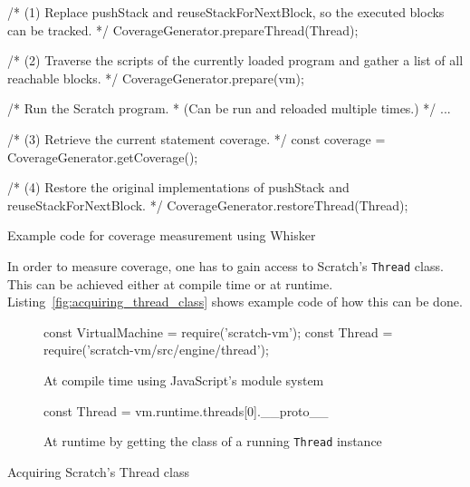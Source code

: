 \begin{listing}[htpb]
    \centering

    \begin{minipage}{.75\textwidth}
        \begin{javascriptcode}
            /* (1) Replace pushStack and reuseStackForNextBlock,
               so the executed blocks can be tracked. */
            CoverageGenerator.prepareThread(Thread);

            /* (2) Traverse the scripts of the currently loaded program
               and gather a list of all reachable blocks. */
            CoverageGenerator.prepare(vm);

            /* Run the Scratch program.
            * (Can be run and reloaded multiple times.) */
            ...

            /* (3) Retrieve the current statement coverage. */
            const coverage = CoverageGenerator.getCoverage();

            /* (4) Restore the original implementations of pushStack and
               reuseStackForNextBlock. */
            CoverageGenerator.restoreThread(Thread);
        \end{javascriptcode}
    \end{minipage}

    \caption{Example code for coverage measurement using Whisker}
    \label{fig:measuring_coverage}
\end{listing}

In order to measure coverage, one has to gain access to Scratch's \texttt{Thread} class.
This can be achieved either at compile time or at runtime.
Listing~\ref{fig:acquiring_thread_class} shows example code of how this can be done.
\parspace

\begin{listing}[htpb]
    \centering

    \begin{subfigure}[b]{.7\textwidth}
        \begin{javascriptcode}
            const VirtualMachine = require('scratch-vm');
            const Thread = require('scratch-vm/src/engine/thread');
        \end{javascriptcode}
        \vspace{-\bigskipamount}
        \caption{At compile time using JavaScript's module system}
    \end{subfigure}

    \bigskip

    \begin{subfigure}[b]{.7\textwidth}
        \begin{javascriptcode}
            const Thread = vm.runtime.threads[0].__proto__
        \end{javascriptcode}
        \vspace{-\bigskipamount}
        \caption{At runtime by getting the class of a running \texttt{Thread} instance}
    \end{subfigure}

    \caption{Acquiring Scratch's Thread class}
    \label{fig:acquiring_thread_class}
\end{listing}

